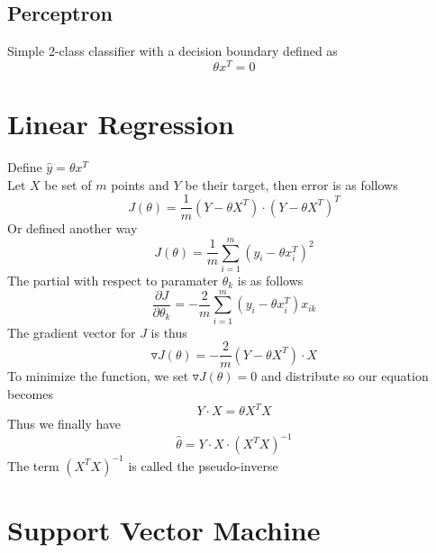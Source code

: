 \documentclass[twoside,11pt]{article}
\theoremstyle{definition}
\begin{document}
\subsection{Perceptron}
Simple 2-class classifier with a decision boundary defined as
\[
\theta x^T = 0
\]

\newpage
\section{Linear Regression}

Define $\hat{y} = \theta x^T$\\
Let $X$ be set of $m$ points and $Y$ be their target, then error is as follows
\[
J(\theta) = \frac{1}{m} (Y - \theta X^T) \cdot (Y- \theta X^T)^T
\]
Or defined another way
\[
J(\theta) = \frac{1}{m} \sum_{i=1}^m (y_i - \theta x_i^T)^2
\]
The partial with respect to paramater $\theta_k$ is as follows
\[
\frac{\partial J}{\partial \theta_k} = -\frac{2}{m} \sum_{i=1}^m (y_i - \theta x_i^T)x_{ik}
\]
The gradient vector for $J$ is thus
\[
\triangledown J(\theta) = -\frac{2}{m} (Y-\theta X^T) \cdot X
\]
To minimize the function, we set $\triangledown J(\theta) = 0$ and distribute so our equation becomes
\[
Y \cdot X = \theta X^T X
\]
Thus we finally have
\[
\hat{\theta} = Y \cdot X \cdot (X^T X)^{-1}
\]
The term $(X^T X)^{-1}$ is called the pseudo-inverse

\newpage

\section{Support Vector Machine}
\end{document}
